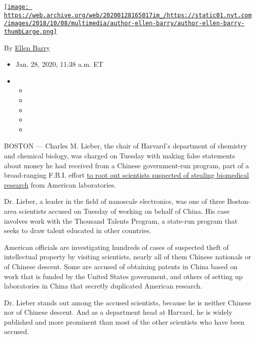 \href{https://web.archive.org/web/20200128165017/https://www.nytimes.com/by/ellen-barry}{\texttt{[image: https://web.archive.org/web/20200128165017im\_/https://static01.nyt.com/images/2018/10/08/multimedia/author-ellen-barry/author-ellen-barry-thumbLarge.png]}}

By
\href{https://web.archive.org/web/20200128165017/https://www.nytimes.com/by/ellen-barry}{Ellen
Barry}

\begin{itemize}
\item
  Jan. 28, 2020, 11:38 a.m. ET
\item
  \begin{itemize}
  \item
  \item
  \item
  \item
  \item
  \end{itemize}
\end{itemize}

BOSTON --- Charles M. Lieber, the chair of Harvard's department of
chemistry and chemical biology, was charged on Tuesday with making false
statements about money he had received from a Chinese government-run
program, part of a broad-ranging F.B.I. effort
\href{https://web.archive.org/web/20200128165017/https://www.nytimes.com/2019/11/04/health/china-nih-scientists.html}{to
root out scientists suspected of stealing biomedical research} from
American laboratories.

Dr. Lieber, a leader in the field of nanoscale electronics, was one of
three Boston-area scientists accused on Tuesday of working on behalf of
China. His case involves work with the Thousand Talents Program, a
state-run program that seeks to draw talent educated in other countries.

American officials are investigating hundreds of cases of suspected
theft of intellectual property by visiting scientists, nearly all of
them Chinese nationals or of Chinese descent. Some are accused of
obtaining patents in China based on work that is funded by the United
States government, and others of setting up laboratories in China that
secretly duplicated American research.

Dr. Lieber stands out among the accused scientists, because he is
neither Chinese nor of Chinese descent. And as a department head at
Harvard, he is widely published and more prominent than most of the
other scientists who have been accused.

